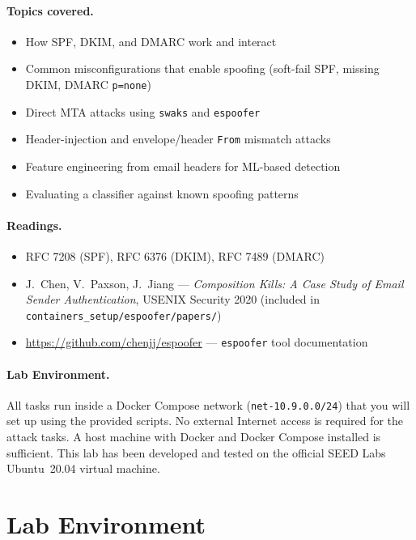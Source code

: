 \documentclass[11pt]{article}
\newcounter{task}
\begin{document}
\paragraph{Topics covered.}
\begin{itemize}[noitemsep]
  \item How SPF, DKIM, and DMARC work and interact
  \item Common misconfigurations that enable spoofing (soft-fail SPF,
    missing DKIM, DMARC \texttt{p=none})
  \item Direct MTA attacks using \texttt{swaks} and \texttt{espoofer}
  \item Header-injection and envelope/header \texttt{From} mismatch
    attacks
  \item Feature engineering from email headers for ML-based detection
  \item Evaluating a classifier against known spoofing patterns
\end{itemize}

\paragraph{Readings.}
\begin{itemize}[noitemsep]
  \item RFC 7208 (SPF), RFC 6376 (DKIM), RFC 7489 (DMARC)
  \item J.\ Chen, V.\ Paxson, J.\ Jiang ---
    \textit{Composition Kills: A Case Study of Email Sender
    Authentication}, USENIX Security 2020
    (included in \texttt{containers\_setup/espoofer/papers/})
  \item \url{https://github.com/chenjj/espoofer} --- \texttt{espoofer} tool
    documentation
\end{itemize}

\paragraph{Lab Environment.}
All tasks run inside a Docker Compose network (\texttt{net-10.9.0.0/24})
that you will set up using the provided scripts.
No external Internet access is required for the attack tasks.
A host machine with Docker and Docker Compose installed is sufficient.
This lab has been developed and tested on the official SEED Labs
Ubuntu~20.04 virtual machine.

\section{Lab Environment}
\end{document}
